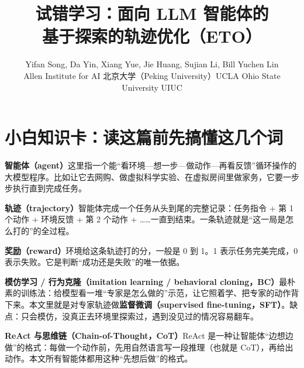 \documentclass[11pt,UTF8,fontset=fandol]{ctexart}
\title{\textbf{试错学习：面向 LLM 智能体的\\基于探索的轨迹优化（ETO）}}
\author{Yifan Song, Da Yin, Xiang Yue, Jie Huang, Sujian Li, Bill Yuchen Lin\\
\small Allen Institute for AI \quad 北京大学（Peking University）\quad UCLA \quad Ohio State University \quad UIUC}
\date{}
\newcommand{\zhcard}[2]{%
  \par\noindent\textbf{#1}\quad #2\par}
\begin{document}
\maketitle

\begin{center}
\end{center}

\medskip

\section*{小白知识卡：读这篇前先搞懂这几个词}

\zhcard{智能体（agent）}{这里指一个能“看环境—想一步—做动作—再看反馈”循环操作的大模型程序。比如让它去网购、做虚拟科学实验、在虚拟房间里做家务，它要一步步执行直到完成任务。}

\zhcard{轨迹（trajectory）}{智能体完成一个任务从头到尾的完整记录：任务指令 + 第 1 个动作 + 环境反馈 + 第 2 个动作 + ……一直到结束。一条轨迹就是“这一局是怎么打的”的全过程。}

\zhcard{奖励（reward）}{环境给这条轨迹打的分，一般是 0 到 1。1 表示任务完美完成，0 表示失败。它是判断“成功还是失败”的唯一依据。}

\zhcard{模仿学习 / 行为克隆（imitation learning / behavioral cloning，BC）}{最朴素的训练法：给模型看一堆“专家是怎么做的”示范，让它照着学、把专家的动作背下来。本文里就是对专家轨迹做\textbf{监督微调（supervised fine-tuning，SFT）}。缺点：只会模仿，没真正去环境里探索过，遇到没见过的情况容易翻车。}

\zhcard{ReAct 与思维链（Chain-of-Thought，CoT）}{ReAct 是一种让智能体“边想边做”的格式：每做一个动作前，先用自然语言写一段推理（也就是 CoT），再给出动作。本文所有智能体都用这种“先想后做”的格式。}
\end{document}
